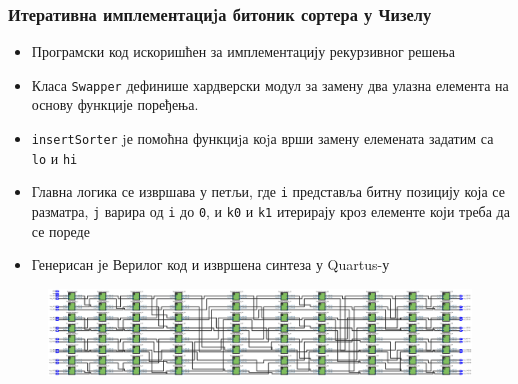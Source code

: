 \begin{frame}[fragile]
\frametitle{Итеративна имплементациjа битоник сортера у Чизелу}
 \begin{itemize}
  \item Програмски код искоришћен за имплементацију рекурзивног решења
  \item Класа \verb+Swapper+ дефинише хардверски модул за замену два улазна елемента на основу функције поређења.
  \item \verb+insertSorter+ jе помоћна функциjа коjа врши замену елемената задатим са \verb+lo+ и \verb+hi+
  \item Главна логика се извршава у петљи, где \verb+i+ представља битну позицију која се разматра, \verb+j+ варира од \verb+i+ до \verb+0+, и \verb+k0+ и \verb+k1+ итерирају кроз елементе који треба да се пореде
  \item Генерисан је Верилог код и извршена синтеза у Quartus-у
 \end{itemize}

\begin{figure}[H]
  \centering
      \includegraphics[scale=0.15]{slike/RTL_Iter_16_8.png}
 \end{figure}
\end{frame}

